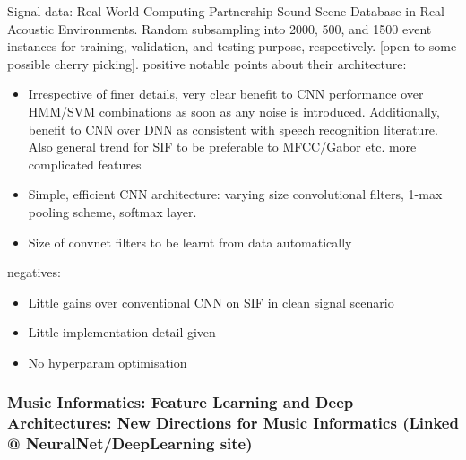 \documentclass[12pt]{llncs}
\begin{document}
Signal data: Real World Computing Partnership Sound Scene Database in Real Acoustic Environments. Random subsampling into  2000, 500, and 1500 event instances for training, validation, and testing purpose, respectively. [open to some possible cherry picking]. 
positive notable points about their architecture:
\begin{itemize}
	\item Irrespective of finer details, very clear benefit to CNN performance over HMM/SVM combinations as soon as any noise is introduced. Additionally, benefit to CNN over DNN as consistent with speech recognition literature. Also general trend for SIF to be preferable to MFCC/Gabor etc. more complicated features
	\item Simple, efficient CNN architecture: varying size convolutional filters, 1-max pooling scheme, softmax layer.
	\item Size of convnet filters to be learnt from data automatically
\end{itemize}
negatives:
\begin{itemize}
	\item Little gains over conventional CNN on SIF in clean signal scenario
	\item Little implementation detail given
	\item No hyperparam optimisation 
\end{itemize}


\subsubsection*{Music Informatics: Feature Learning and Deep Architectures: New Directions for Music Informatics (Linked @ NeuralNet/DeepLearning site) \cite{humphrey2013feature}}
\end{document}
